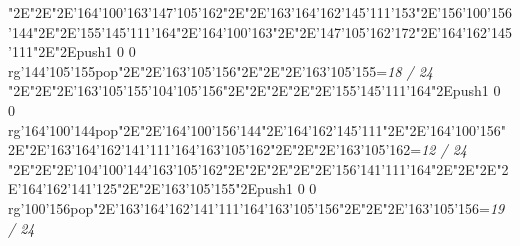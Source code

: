\null\vfill\enskip\enskip\enskip\ipa\char"2E\enskip\enskip\enskip\ipa\char"2E\enskip\ipa\char"2E\ipa\char'164\ipa\char'100\ipa\char'163\bigskip\ipa\char'147\ipa\char'105\ipa\char'162\ipa\char"2E\enskip\enskip\enskip\ipa\char"2E\ipa\char'163\ipa\char'164\ipa\char'162\ipa\char'145\ipa\char'111\ipa\char'153\bigskip\enskip\enskip\ipa\char"2E\ipa\char'156\ipa\char'100\ipa\char'156\ipa\char'144\ipa\char"2E\enskip\ipa\char"2E\ipa\char'155\ipa\char'145\ipa\char'111\ipa\char'164\ipa\char"2E\ipa\char'164\ipa\char'100\ipa\char'163\ipa\char"2E\enskip\enskip\enskip\ipa\char"2E\ipa\char'147\ipa\char'105\ipa\char'162\ipa\char'172\bigskip\enskip\ipa\char"2E\ipa\char'164\ipa\char'162\ipa\char'145\ipa\char'111\ipa\char"2E\enskip\enskip\ipa\char"2E\pdfcolorstack\match push{1 0 0 rg}\ipa\char'144\ipa\char'105\ipa\char'155\pdfcolorstack\match pop{}\ipa\char"2E\enskip\enskip\ipa\char"2E\enskip\enskip\enskip\enskip\enskip\enskip\bigskip\ipa\char'163\ipa\char'105\ipa\char'156\ipa\char"2E\enskip\enskip\ipa\char"2E\enskip\enskip\enskip\ipa\char"2E\ipa\char'163\ipa\char'105\ipa\char'155\bigskip\vfill\footline={\hfill\tenrm\it 18 / 24}\eject
\null\vfill\enskip\enskip\enskip\ipa\char"2E\enskip\enskip\enskip\ipa\char"2E\enskip\ipa\char"2E\ipa\char'163\ipa\char'105\ipa\char'155\bigskip\ipa\char'104\ipa\char'105\ipa\char'156\ipa\char"2E\enskip\enskip\enskip\ipa\char"2E\enskip\enskip\enskip\enskip\enskip\enskip\bigskip\enskip\enskip\ipa\char"2E\enskip\enskip\enskip\enskip\ipa\char"2E\enskip\ipa\char"2E\ipa\char'155\ipa\char'145\ipa\char'111\ipa\char'164\ipa\char"2E\pdfcolorstack\match push{1 0 0 rg}\ipa\char'164\ipa\char'100\ipa\char'144\pdfcolorstack\match pop{}\ipa\char"2E\enskip\enskip\enskip\ipa\char"2E\ipa\char'164\ipa\char'100\ipa\char'156\ipa\char'144\bigskip\enskip\ipa\char"2E\ipa\char'164\ipa\char'162\ipa\char'145\ipa\char'111\ipa\char"2E\enskip\enskip\ipa\char"2E\ipa\char'164\ipa\char'100\ipa\char'156\ipa\char"2E\enskip\enskip\ipa\char"2E\ipa\char'163\ipa\char'164\ipa\char'162\ipa\char'141\ipa\char'111\ipa\char'164\bigskip\ipa\char'163\ipa\char'105\ipa\char'162\ipa\char"2E\enskip\enskip\ipa\char"2E\enskip\enskip\enskip\ipa\char"2E\ipa\char'163\ipa\char'105\ipa\char'162\bigskip\vfill\footline={\hfill\tenrm\it 12 / 24}\eject
\null\vfill\enskip\enskip\enskip\ipa\char"2E\enskip\enskip\enskip\ipa\char"2E\enskip\ipa\char"2E\ipa\char'104\ipa\char'100\ipa\char'144\bigskip\ipa\char'163\ipa\char'105\ipa\char'162\ipa\char"2E\enskip\enskip\enskip\ipa\char"2E\enskip\enskip\enskip\enskip\enskip\enskip\bigskip\enskip\enskip\ipa\char"2E\enskip\enskip\enskip\enskip\ipa\char"2E\enskip\ipa\char"2E\ipa\char'156\ipa\char'141\ipa\char'111\ipa\char'164\ipa\char"2E\enskip\enskip\enskip\ipa\char"2E\enskip\enskip\enskip\ipa\char"2E\enskip\enskip\enskip\enskip\bigskip\enskip\ipa\char"2E\ipa\char'164\ipa\char'162\ipa\char'141\ipa\char'125\ipa\char"2E\enskip\enskip\ipa\char"2E\ipa\char'163\ipa\char'105\ipa\char'155\ipa\char"2E\pdfcolorstack\match push{1 0 0 rg}\ipa\char'100\ipa\char'156\pdfcolorstack\match pop{}\ipa\char"2E\ipa\char'163\ipa\char'164\ipa\char'162\ipa\char'141\ipa\char'111\ipa\char'164\bigskip\ipa\char'163\ipa\char'105\ipa\char'156\ipa\char"2E\enskip\enskip\ipa\char"2E\enskip\enskip\enskip\ipa\char"2E\ipa\char'163\ipa\char'105\ipa\char'156\bigskip\vfill\footline={\hfill\tenrm\it 19 / 24}\eject
